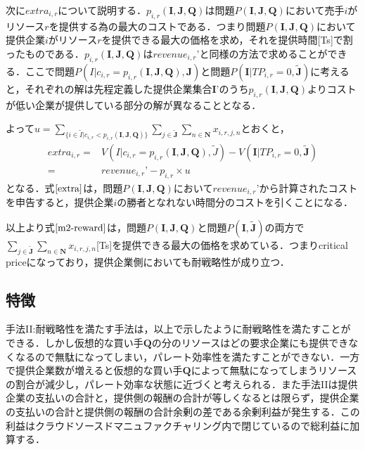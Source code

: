 次に\(extra_{i,r}\)について説明する．\(p_{i,r}(\boldsymbol{I},\boldsymbol{J},\boldsymbol{Q})\)は問題\(P(\boldsymbol{I},\boldsymbol{J},\boldsymbol{Q})\)において売手\(i\)がリソース\(r\)を提供する為の最大のコストである．つまり問題\(P(\boldsymbol{I},\boldsymbol{J},\boldsymbol{Q})\)において提供企業\(i\)がリソース\(r\)を提供できる最大の価格を求め，それを提供時間{[}Ts{]}で割ったものである．\(p_{i,r}(\boldsymbol{I},\boldsymbol{J},\boldsymbol{Q})\)は\(revenue_{i,r}’\)と同様の方法で求めることができる．ここで問題\(P(I|c_{i,r}=p_{i,r}(\boldsymbol{I},\boldsymbol{J},\boldsymbol{Q}),\boldsymbol{J})\)と問題\(P(\boldsymbol{I}|TP_{i,r}=0,\boldsymbol{\tilde{J}})\)に考えると，それぞれの解は先程定義した提供企業集合\(\boldsymbol{I’}\)のうち\(p_{i,r}(\boldsymbol{I},\boldsymbol{J},\boldsymbol{Q})\)よりコストが低い企業が提供している部分の解が異なることとなる．

よって\(u=\sum_{\{i \in \tilde{I}| c_{i,r}<p_{i,r}(\boldsymbol{I},\boldsymbol{J},\boldsymbol{Q})\}}\sum_{j\in\boldsymbol{\tilde{J}}}\sum_{n\in\boldsymbol{N}}x_{i,r,j,n}\)とおくと，
\begin{align}
extra_{i,r}
=&V(I|c_{i,r}=p_{i,r}(\boldsymbol{I},\boldsymbol{J},\boldsymbol{Q}),\tilde{J})-  V(\boldsymbol{I}|TP_{i,r}=0,\boldsymbol{\tilde{J}}) \\
=&revenue_{i,r}’-p_{i,r} \times u \label{extra}
\end{align}
となる．式\(\eqref{extra}\)は，問題\(P(\boldsymbol{I},\boldsymbol{J},\boldsymbol{Q})\)において\(revenue_{i,r}’\)から計算されたコストを申告すると，提供企業\(i\)の勝者となれない時間分のコストを引くことになる．

以上より式\(\eqref{m2-reward}\)は，問題\(P(\boldsymbol{I},\boldsymbol{J},\boldsymbol{Q})\)と問題\(P(\boldsymbol{I},\boldsymbol{\tilde{J}})\)の両方で\(\sum_{j\in\boldsymbol{\tilde{J}}}\sum_{n\in\boldsymbol{N}} x_{i,r,j,n}\){[}Ts{]}を提供できる最大の価格を求めている．つまりcritical
priceになっており，提供企業側においても耐戦略性が成り立つ．

\hypertarget{ux7279ux5fb4-1}{%
\subsection{特徴}\label{ux7279ux5fb4-1}}

手法II:耐戦略性を満たす手法は，以上で示したように耐戦略性を満たすことができる．しかし仮想的な買い手\(\boldsymbol{Q}\)の分のリソースはどの要求企業にも提供できなくなるので無駄になってしまい，パレート効率性を満たすことができない．一方で提供企業数が増えると仮想的な買い手\(\boldsymbol{Q}\)によって無駄になってしまうリソースの割合が減少し，パレート効率な状態に近づくと考えられる．また手法IIは提供企業の支払いの合計と，提供側の報酬の合計が等しくなるとは限らず，提供企業の支払いの合計と提供側の報酬の合計余剰の差である余剰利益が発生する．この利益はクラウドソースドマニュファクチャリング内で閉じているので総利益に加算する．

